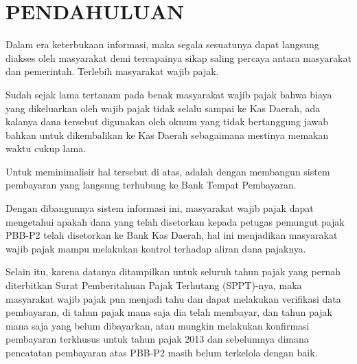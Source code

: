 \chapter{PENDAHULUAN}

Dalam era keterbukaan informasi, maka segala sesuatunya dapat langsung diakses oleh masyarakat demi tercapainya sikap saling percaya antara masyarakat dan pemerintah. Terlebih masyarakat wajib pajak.

Sudah sejak lama tertanam pada benak masyarakat wajib pajak bahwa biaya yang dikeluarkan oleh wajib pajak tidak selalu sampai ke Kas Daerah, ada kalanya dana tersebut digunakan oleh oknum yang tidak bertanggung jawab bahkan untuk dikembalikan ke Kas Daerah sebagaimana mestinya memakan waktu cukup lama.

Untuk meminimalisir hal tersebut di atas, adalah dengan membangun sistem pembayaran yang langsung terhubung ke Bank Tempat Pembayaran.

Dengan dibangunnya sistem informasi ini, masyarakat wajib pajak dapat mengetahui apakah dana yang telah disetorkan kepada petugas pemungut pajak PBB-P2 telah disetorkan ke Bank Kas Daerah, hal ini menjadikan masyarakat wajib pajak mampu melakukan kontrol terhadap aliran dana pajaknya.

Selain itu, karena datanya ditampilkan untuk seluruh tahun pajak yang pernah diterbitkan Surat Pemberitahuan Pajak Terhutang (SPPT)-nya, maka masyarakat wajib pajak pun menjadi tahu dan dapat melakukan verifikasi data pembayaran, di tahun pajak mana saja dia telah membayar, dan tahun pajak mana saja yang belum dibayarkan, atau mungkin melakukan konfirmasi pembayaran terkhusus untuk tahun pajak 2013 dan sebelumnya dimana pencatatan pembayaran atas PBB-P2 masih belum terkelola dengan baik.